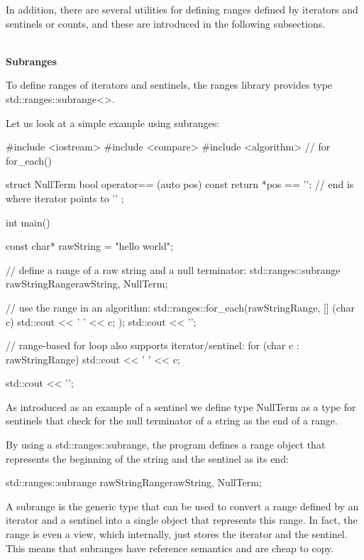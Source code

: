 In addition, there are several utilities for defining ranges defined by iterators and sentinels or counts, and these are introduced in the following subsections.

\noindent
\hspace*{\fill} \\ %
\textbf{Subranges}

To define ranges of iterators and sentinels, the ranges library provides type std::ranges::subrange<>.

Let us look at a simple example using subranges:


\begin{cpp}
#include <iostream>
#include <compare>
#include <algorithm> // for for_each()

struct NullTerm {
	bool operator== (auto pos) const {
		return *pos == '\0'; // end is where iterator points to ’\0’
	}
};

int main()
{
	const char* rawString = "hello world";
	
	// define a range of a raw string and a null terminator:
	std::ranges::subrange rawStringRange{rawString, NullTerm{}};
	
	// use the range in an algorithm:
	std::ranges::for_each(rawStringRange,
	[] (char c) {
		std::cout << ' ' << c;
	});
	std::cout << '\n';
	
	// range-based for loop also supports iterator/sentinel:
	for (char c : rawStringRange) {
		std::cout << ' ' << c;
	}
	
	std::cout << '\n';
}
\end{cpp}

As introduced as an example of a sentinel we define type NullTerm as a type for sentinels that check for the null terminator of a string as the end of a range.

By using a std::ranges::subrange, the program defines a range object that represents the beginning of the string and the sentinel as its end:

\begin{cpp}
std::ranges::subrange rawStringRange{rawString, NullTerm{}};
\end{cpp}

A subrange is the generic type that can be used to convert a range defined by an iterator and a sentinel into a single object that represents this range. In fact, the range is even a view, which internally, just stores the iterator and the sentinel. This means that subranges have reference semantics and are cheap to copy.

